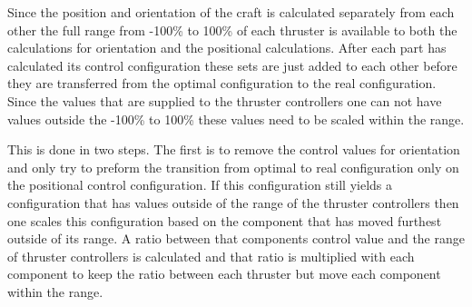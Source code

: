 Since the position and orientation of the craft is calculated separately from each other the full range from -100\% to 100\% of each thruster is available to both the calculations for orientation and the positional calculations. After each part has calculated its control configuration these sets are just added to each other before they are transferred from the optimal configuration to the real configuration. Since the values that are supplied to the thruster controllers one can not have values outside the -100\% to 100\% these values need to be scaled within the range. 

This is done in two steps. The first is to remove the control values for orientation and only try to preform the transition from optimal to real configuration only on the positional control configuration. If this configuration still yields a configuration that has values outside of the range of the thruster controllers then one scales this configuration based on the component that has moved furthest outside of its range. A ratio between that components control value and the range of thruster controllers is calculated and that ratio is multiplied with each component to keep the ratio between each thruster but move each component within the range. 